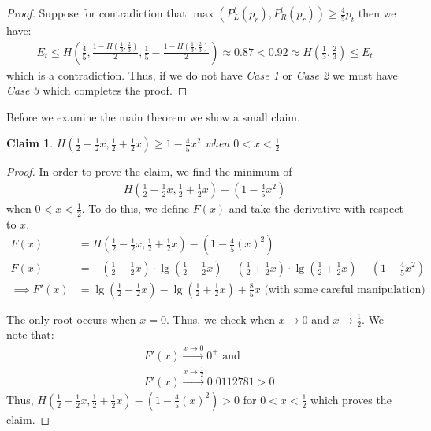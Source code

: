 \documentclass[letterpaper,12pt,titlepage,oneside,final]{book}
\theoremstyle{plain}
\begin{document}
\begin{proof}
Suppose for contradiction that $\max(P^t_L(p_r), P^t_R(p_r)) \geq \frac{4}{5} p_t$ then we have:
\begin{align*}
E_t \leq H(\frac{4}{5}, \frac{1-H(\frac{1}{3}, \frac{2}{3})}{2}, \frac{1}{5}-\frac{1-H(\frac{1}{3}, \frac{2}{3})}{2}) \approx 0.87 < 0.92 \approx H(\frac{1}{3}, \frac{2}{3}) \leq E_t
\end{align*}
which is a contradiction.
Thus, if we do not have \textit{Case 1} or \textit{Case 2} we must have \textit{Case 3} which completes the proof.



\end{proof}

Before we examine the main theorem we show a small claim.

\newtheorem{claim}{Claim}
\begin{claim}\label{Claim1}
$H(\frac{1}{2}-\frac{1}{2} x, \frac{1}{2} + \frac{1}{2} x) \geq 1- \frac{4}{5} x^2$ when $0 < x < \frac{1}{2}$
\end{claim}

\begin{proof}
In order to prove the claim, we find the minimum of
\begin{align*}
H(\frac{1}{2}-\frac{1}{2} x, \frac{1}{2} + \frac{1}{2} x) - (1 - \frac{4}{5} x^2) 
\end{align*}
when $0 < x < \frac{1}{2}$. To do this, we define $F(x)$ and take the derivative with respect to $x$.
\begin{align*}
F(x) &= H(\frac{1}{2}-\frac{1}{2} x, \frac{1}{2} + \frac{1}{2} x) - (1 - \frac{4}{5} (x)^2) \\
F(x) &= - (\frac{1}{2}-\frac{1}{2} x)\cdot \lg(\frac{1}{2}-\frac{1}{2} x) - (\frac{1}{2} + \frac{1}{2} x)\cdot\lg(\frac{1}{2} + \frac{1}{2} x) - (1 - \frac{4}{5} x^2) \\
\implies F'(x) &= \lg(\frac{1}{2}-\frac{1}{2} x) - \lg(\frac{1}{2} + \frac{1}{2} x) + \frac{8}{5}x \text{ (with some careful manipulation)}
\end{align*}

The only root occurs when $x = 0$. Thus, we check when $x \rightarrow 0$ and $x \rightarrow \frac{1}{2}$. We note that: \\
\begin{align*}
&F'(x) \xrightarrow{x \to 0} 0^{+}  \text{ and} \\
&F'(x) \xrightarrow{x \to \frac{1}{2}} 0.0112781 > 0
\end{align*}
Thus, $H(\frac{1}{2}-\frac{1}{2} x, \frac{1}{2} + \frac{1}{2} x) - (1 - \frac{4}{5} (x)^2) > 0$ for $ 0 < x < \frac{1}{2}$ which proves the claim.
\end{proof} 
\end{document}
